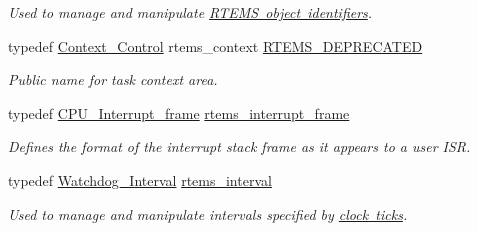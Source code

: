 \begin{DoxyCompactItemize}
\begin{DoxyCompactList}\small\item\em Used to manage and manipulate \mbox{\hyperlink{group__RTEMSAPIClassic_ClassicRTEMSSubSecObjectIdentifiers}{R\+T\+E\+MS object identifiers}}. \end{DoxyCompactList}\item 
typedef \mbox{\hyperlink{structContext__Control}{Context\+\_\+\+Control}} rtems\+\_\+context \mbox{\hyperlink{group__ClassicTasks_ga6e7bd1624f0779bd750f1726e15cb910}{R\+T\+E\+M\+S\+\_\+\+D\+E\+P\+R\+E\+C\+A\+T\+ED}}
\begin{DoxyCompactList}\small\item\em Public name for task context area. \end{DoxyCompactList}\item 
typedef \mbox{\hyperlink{structCPU__Interrupt__frame}{C\+P\+U\+\_\+\+Interrupt\+\_\+frame}} \mbox{\hyperlink{group__ClassicTasks_ga6374920e14baf6b41535ae52b06e6e1c}{rtems\+\_\+interrupt\+\_\+frame}}
\begin{DoxyCompactList}\small\item\em Defines the format of the interrupt stack frame as it appears to a user I\+SR. \end{DoxyCompactList}\item 
\mbox{\label{group__ClassicTasks_gad39c43f949683d46874e3a5586b93aee}} 
typedef \mbox{\hyperlink{group__RTEMSScoreWatchdog_gaa1834fd7531ca9bb5c4ca6fd990388d5}{Watchdog\+\_\+\+Interval}} \mbox{\hyperlink{group__ClassicTasks_gad39c43f949683d46874e3a5586b93aee}{rtems\+\_\+interval}}
\begin{DoxyCompactList}\small\item\em Used to manage and manipulate intervals specified by \mbox{\hyperlink{group__RTEMSAPIClassic_ClassicRTEMSSecTime}{clock ticks}}. \end{DoxyCompactList}\end{DoxyCompactItemize}
